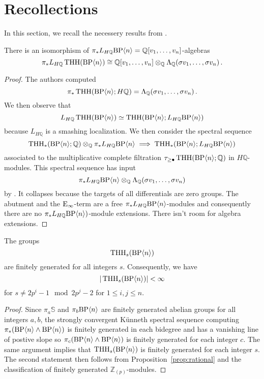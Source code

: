 \section{Recollections}
In this section, we recall the necessery results from \cite{AKCH23}. 

\begin{proposition}\label{prop:rational}
There is an isomorphism of $\pi_{*}L_{H\mathbb{Q}}\mathrm{BP}\langle n\rangle=\mathbb{Q}[v_{1},\dots ,v_{n}]$-algebras
\[ \pi_{*}L_{H\mathbb{Q}}\operatorname{THH}(\mathrm{BP}\langle n\rangle )\cong\mathbb{Q}[v_{1},\dots ,v_{n}]\otimes_{\mathbb{Q}} \Lambda_{\mathbb{Q}} (\sigma v_{1},\dots ,\sigma v_{n}) \,.\]
\end{proposition}
\begin{proof}
The authors computed 
\[ \pi_{*}\operatorname{THH}(\mathrm{BP}\langle n\rangle;H\mathbb{Q} )=\Lambda_{\mathbb{Q}} (\sigma v_{1},\dots ,\sigma v_{n})\,.\]
We then observe that 
\[L_{H\mathbb{Q}}\operatorname{THH}(\mathrm{BP}\langle n\rangle )\simeq \operatorname{THH}(\mathrm{BP}\langle n\rangle;L_{H\mathbb{Q}}\mathrm{BP}\langle n\rangle )\]
because $L_{H\mathbb{Q}}$ is a smashing localization. We then consider the spectral sequence 
\[
\operatorname{THH}_{*}(\mathrm{BP}\langle n\rangle;\mathbb{Q})\otimes_{\mathbb{Q}} \pi_{*}L_{H\mathbb{Q}}\mathrm{BP}\langle n\rangle\implies \operatorname{THH}_{*}(\mathrm{BP}\langle n\rangle;L_{H\mathbb{Q}}\mathrm{BP}\langle n\rangle)
\]
associated to the multiplicative complete filtration $\tau_{\ge \bullet}\operatorname{THH}(\mathrm{BP}\langle n\rangle;\mathbb{Q})$ in $H\mathbb{Q}$-modules. This spectral sequence has input 
\[ \pi_{*}L_{H\mathbb{Q}}\mathrm{BP}\langle n\rangle\otimes_{\mathbb{Q}} \Lambda_{\mathbb{Q}} (\sigma v_{1},\dots ,\sigma v_{n})\]
by \cite[Proposition~3.7]{AKCH22}. It collapses because the targets of all differentials are zero groups. The abutment and the $\mathrm{E}_{\infty}$-term are a free $\pi_{*}L_{H\mathbb{Q}}\mathrm{BP}\langle n\rangle$-modules and consequently there are no $\pi_{*}L_{H\mathbb{Q}}\mathrm{BP}\langle n\rangle)$-module extensions. There isn't room for algebra extensions. 
\end{proof}

\begin{proposition}
The groups 
\[ 
\operatorname{THH}_{s}(\mathrm{BP}\langle n\rangle )
\]
are finitely generated for all integers $s$. 
Consequently, we have 
\[
|\operatorname{THH}_{s}(\mathrm{BP}\langle n\rangle )|<\infty\]
for $s\ne 2p^{i}-1 \mod 2p^{j}-2$ for $1\le i,j\le n$. 
\end{proposition}
\begin{proof}
Since $\pi_{a}\mathbb{S}$ and $\pi_{b}\mathrm{BP}\langle n\rangle$ are finitely generated abelian groups for all integers $a,b$, the strongly convergent K\"unneth spectral sequence computing $\pi_{*}(\mathrm{BP}\langle n\rangle\wedge \mathrm{BP}\langle n\rangle)$ is finitely generated in each bidegree and has a vanishing line of postive slope so $\pi_{c}(\mathrm{BP}\langle n\rangle\wedge \mathrm{BP}\langle n\rangle)$ is finitely generated for each integer $c$. The same argument implies that $\operatorname{THH}_{s}(\mathrm{BP}\langle n\rangle)$ is finitely generated for each integer $s$. The second statement then follows from Proposition~\ref{prop:rational} and the classification of finitely generated $\mathbb{Z}_{(p)}$-modules. 
\end{proof}